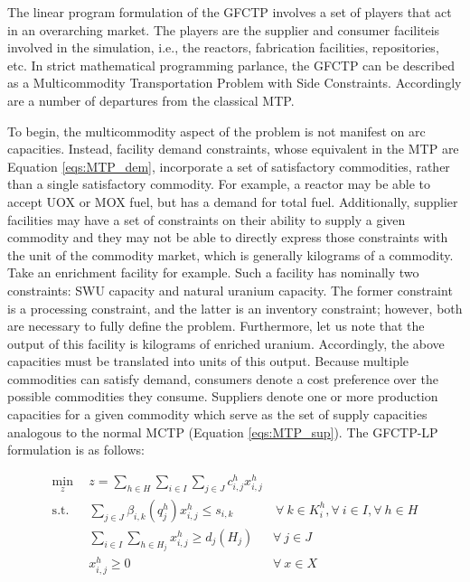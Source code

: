 The linear program formulation of the GFCTP involves a set of players that act
in an overarching market. The players are the supplier and consumer faciliteis
involved in the simulation, i.e., the reactors, fabrication facilities,
repositories, etc. In strict mathematical programming parlance, the GFCTP can be
described as a Multicommodity Transportation Problem with Side
Constraints. Accordingly are a number of departures from the classical MTP.

To begin, the multicommodity aspect of the problem is not manifest on arc
capacities. Instead, facility demand constraints, whose equivalent in the MTP
are Equation \ref{eqs:MTP_dem}, incorporate a set of satisfactory commodities,
rather than a single satisfactory commodity. For example, a reactor may be able
to accept UOX or MOX fuel, but has a demand for total fuel. Additionally,
supplier facilities may have a set of constraints on their ability to supply a
given commodity and they may not be able to directly express those constraints
with the unit of the commodity market, which is generally kilograms of a
commodity. Take an enrichment facility for example. Such a facility has
nominally two constraints: SWU capacity and natural uranium capacity. The former
constraint is a processing constraint, and the latter is an inventory
constraint; however, both are necessary to fully define the
problem. Furthermore, let us note that the output of this facility is kilograms
of enriched uranium. Accordingly, the above capacities must be translated into
units of this output. Because multiple commodities can satisfy demand, consumers
denote a cost preference over the possible commodities they consume. Suppliers
denote one or more production capacities for a given commodity which serve as
the set of supply capacities analogous to the normal MCTP
(Equation \ref{eqs:MTP_sup}). The GFCTP-LP formulation is as follows:

\begin{subequations}\label{eqs:GFCTP-LP}
  \begin{align}
    \min_{z} \:\: & 
    z = \sum_{h \in H}\sum_{i \in I}\sum_{j \in J}c_{i,j}^{h} x_{i,j}^{h} 
    & \label{eqs:GFCTP-LP_obj} \\
    \text{s.t.} \:\: &
    \sum_{j \in J}\beta_{i,k}(q_{j}^{h}) x_{i,j}^{h} \leq s_{i,k} 
    &
    \: \forall \: k \in K_{i}^{h},  
    \forall \: i \in I, \forall \: h \in H \label{eqs:GFCTP-LP_sup} \\
    &
    \sum_{i \in I}\sum_{h \in H_{j}} x_{i,j}^{h} \geq d_{j}(H_{j}) 
    & 
    \forall \: j \in J \label{eqs:GFCTP-LP_dem} \\
    &
    x^h_{i,j} \geq 0
    &
    \forall \: x \in X \label{eqs:GFCTP-LP_x}
  \end{align}
\end{subequations}

